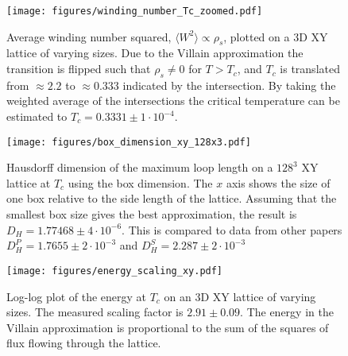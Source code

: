 \begin{figure}[h!]
    \centering
        \texttt{[image: figures/winding\_number\_Tc\_zoomed.pdf]}
    \caption{Average winding number squared, $\langle W^2 \rangle \propto \rho_s$, plotted on a 3D XY lattice of varying sizes. Due to the Villain approximation the transition is flipped such that $\rho_s \neq 0$ for $T > T_c$, and $T_c$ is translated from $\approx 2.2$ \cite{Gottlob:CritBehaviour3DXY} to $\approx 0.333$ indicated by the intersection. By taking the weighted average of the intersections the critical temperature can be estimated to $T_c = 0.3331 \pm 1 \cdot 10^{-4}$.}
    \label{fig:results_windingnumberTcZoomed}
\end{figure}

\begin{figure}[h!]
    \centering
        \texttt{[image: figures/box\_dimension\_xy\_128x3.pdf]}
    \caption{Hausdorff dimension of the maximum loop length on a $128^3$ XY lattice at $T_c$ using the box dimension. The $x$ axis shows the size of one box relative to the side length of the lattice. Assuming that the smallest box size gives the best approximation, the result is $D_H = 1.77468 \pm 4 \cdot 10^{-6}$. This is compared to data from other papers $D_H^P = 1.7655 \pm 2 \cdot 10^{-3}$ \cite{Prokofev:comment_on_hove_hausdorff_crit_fluct} and $D_H^S = 2.287 \pm 2 \cdot 10^{-3}$ \cite{Hove:hausdorff_crit_fluctuations}}
    \label{fig:results_boxdimension}
\end{figure}


\begin{figure}[h!]
    \centering
        \texttt{[image: figures/energy\_scaling\_xy.pdf]}
    \caption{Log-log plot of the energy at $T_c$ on an 3D XY lattice of varying sizes. The measured scaling factor is $2.91 \pm 0.09$. The energy in the Villain approximation is proportional to the sum of the squares of flux flowing through the lattice.}
    \label{fig:results_energyxy}
\end{figure}

